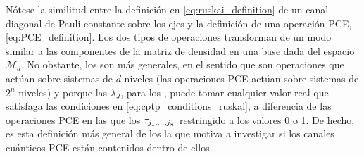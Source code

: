 Nótese la similitud entre la definición en \eqref{eq:ruskai_definition} 
de un canal diagonal de Pauli constante
sobre los ejes y la definición de una operación PCE, \eqref{eq:PCE_definition}.
Los dos tipos de operaciones transforman de 
un modo similar a las componentes de la matriz de densidad en una 
base dada del espacio $\mathcal{M}_d$.
No obstante, los \ruskai{} son más generales, en el sentido que son
operaciones que actúan sobre sistemas de $d$ niveles (las 
operaciones PCE actúan sobre sistemas de $2^n$ niveles) y porque 
las $\lambda_J$, para los \ruskai{}, puede tomar cualquier valor real que 
satisfaga las condiciones en \eqref{eq:cptp_conditions_ruskai}, a diferencia
de las operaciones PCE en las que los $\tau_{j_1,\ldots ,j_n}$ restringido a los valores 0 o 1.
De hecho, es esta definición más general de los \ruskai{} la que motiva a
investigar si los canales cuánticos PCE están contenidos dentro de ellos.

%
%
%


